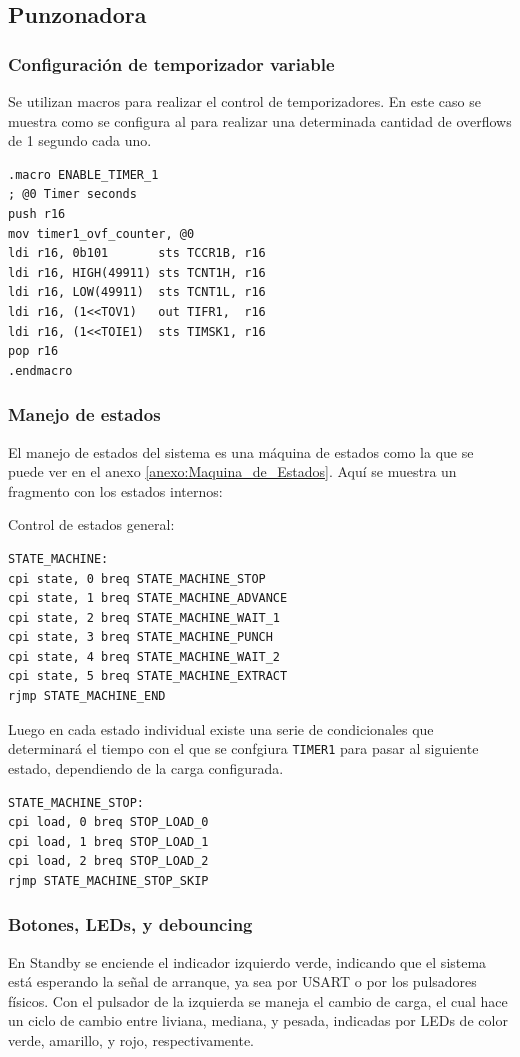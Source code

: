 \subsection{Punzonadora}

\subsubsection{Configuración de temporizador variable}
Se utilizan macros para realizar el control de temporizadores. En este caso se muestra como se configura al  para realizar una determinada cantidad de overflows de 1 segundo cada uno. 

\begin{verbatim}
.macro ENABLE_TIMER_1
; @0 Timer seconds
push r16
mov timer1_ovf_counter, @0
ldi r16, 0b101		 sts TCCR1B, r16
ldi r16, HIGH(49911) sts TCNT1H, r16
ldi r16, LOW(49911)	 sts TCNT1L, r16 
ldi r16, (1<<TOV1)   out TIFR1,  r16 
ldi r16, (1<<TOIE1)  sts TIMSK1, r16 
pop r16
.endmacro
\end{verbatim}


\subsubsection{Manejo de estados}
El manejo de estados del sistema es una máquina de estados como la que se puede ver en el anexo \ref{anexo:Maquina_de_Estados}. Aquí se muestra un fragmento con los estados internos:

Control de estados general:
\begin{verbatim}
STATE_MACHINE:
cpi state, 0 breq STATE_MACHINE_STOP
cpi state, 1 breq STATE_MACHINE_ADVANCE
cpi state, 2 breq STATE_MACHINE_WAIT_1
cpi state, 3 breq STATE_MACHINE_PUNCH
cpi state, 4 breq STATE_MACHINE_WAIT_2
cpi state, 5 breq STATE_MACHINE_EXTRACT
rjmp STATE_MACHINE_END
\end{verbatim}

Luego en cada estado individual existe una serie de condicionales que determinará el tiempo con el que se confgiura \texttt{TIMER1} para pasar al siguiente estado, dependiendo de la carga configurada.
\begin{verbatim}
STATE_MACHINE_STOP:
cpi load, 0 breq STOP_LOAD_0
cpi load, 1 breq STOP_LOAD_1
cpi load, 2 breq STOP_LOAD_2
rjmp STATE_MACHINE_STOP_SKIP
\end{verbatim}

\subsubsection{Botones, LEDs,  y debouncing}
En Standby se enciende el indicador izquierdo verde, indicando que el sistema está esperando la señal de arranque, ya sea por USART o por los pulsadores físicos. Con el pulsador de la izquierda se maneja el cambio de carga, el cual hace un ciclo de cambio entre liviana, mediana, y pesada, indicadas por LEDs de color verde, amarillo, y rojo, respectivamente.

